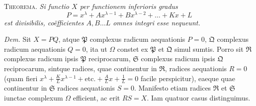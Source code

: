 \textsc{Theorema.} \textit{Si functio \(X\) per functionem inferioris gradus} \[P=x^\lambda+Ax^{\lambda-1}+Bx^{\lambda-2}+\ldots+Kx+L\] \textit{est divisibilis, coëfficientes \(A,\allowbreak B\ldots L\) omnes integri esse nequeunt.}

\textit{Dem.} Sit \(X=PQ\), atque \(\mathfrak P\) complexus radicum aequationis \(P=0\), \(\mathfrak Q\) complexus radicum aequationis \(Q=0\), ita ut \(\Omega\) constet ex \(\mathfrak P\) et \(\mathfrak Q\) simul sumtis. Porro sit \(\mathfrak R\) complexus radicum ipsis \(\mathfrak P\) reciprocarum, \(\mathfrak S\) complexus radicum ipsis \(\mathfrak Q\) reciprocarum, sintque radices, quae continentur in \(\mathfrak R\), radices aequationis \(R=0\) (quam fieri \(x^\lambda+\frac KLx^{\lambda-1}+\mathrm{etc.}+\frac ALx+\frac1L=0\) facile perspicitur), eaeque quae continentur in \(\mathfrak S\) radices aequationis \(S=0\). Manifesto etiam radices \(\mathfrak R\) et \(\mathfrak S\) iunctae complexum \(\Omega\) efficient, ac erit \(RS=X\). Iam quatuor casus distinguimus.

